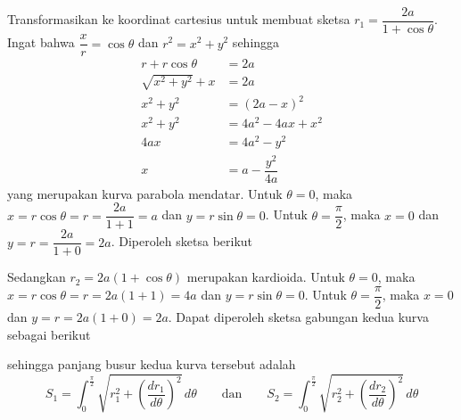 \documentclass{article}
\begin{document}
\begin{enumerate}
	Transformasikan ke koordinat cartesius untuk membuat sketsa $r_1=\dfrac{2a}{1+\cos\theta}$. Ingat bahwa $\dfrac{x}{r}=\cos\theta$ dan $r^2=x^2+y^2$ sehingga
	\begin{align*}
	r+r\cos\theta &=2a\\
	\sqrt{x^2+y^2}+x &= 2a\\
	x^2+y^2 &= (2a-x)^2\\
	x^2+y^2 &= 4a^2-4ax+x^2\\
	4ax &= 4a^2-y^2\\
	x &= a-\dfrac{y^2}{4a}
	\end{align*}
	yang merupakan kurva parabola mendatar. Untuk $\theta=0$, maka $x=r\cos\theta=r=\dfrac{2a}{1+1}=a$ dan $y=r\sin\theta=0$. Untuk $\theta=\dfrac{\pi}{2}$, maka $x=0$ dan $y=r=\dfrac{2a}{1+0}=2a$. Diperoleh sketsa berikut
	\begin{center}
	\end{center}
	Sedangkan $r_2=2a(1+\cos\theta)$ merupakan kardioida. Untuk $\theta=0$, maka $x=r\cos\theta=r=2a(1+1)=4a$ dan $y=r\sin\theta=0$. Untuk $\theta=\dfrac{\pi}{2}$, maka $x=0$ dan $y=r=2a(1+0)=2a$. Dapat diperoleh sketsa gabungan kedua kurva sebagai berikut
	\begin{center}
	\end{center}
	sehingga panjang busur kedua kurva tersebut adalah 
	$$ S_1 = \int_0^{\frac{\pi}{2}} \sqrt{r_1^2+\left(\frac{dr_1}{d\theta}\right)^2}\, d\theta \qquad \text{dan}\qquad S_2 = \int_0^{\frac{\pi}{2}} \sqrt{r_2^2+\left(\frac{dr_2}{d\theta}\right)^2}\, d\theta $$

\end{enumerate}
\end{document}
